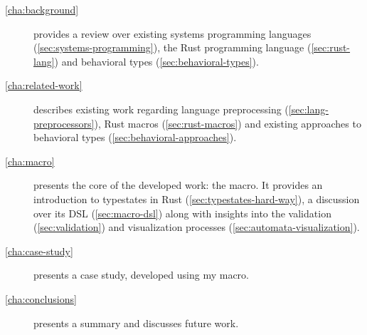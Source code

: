 \begin{description}
    \item[\autoref{cha:background}] provides a review over
        existing systems programming languages (\autoref{sec:systems-programming}),
        the Rust programming language (\autoref{sec:rust-lang}) and
        behavioral types (\autoref{sec:behavioral-types}).
    \item[\autoref{cha:related-work}] describes existing work regarding
        language preprocessing (\autoref{sec:lang-preprocessors}),
        Rust macros (\autoref{sec:rust-macros}) and
        existing approaches to behavioral types (\autoref{sec:behavioral-approaches}).
    \item[\autoref{cha:macro}] presents the core of the developed work: the  macro.
        It provides an introduction to typestates in Rust (\autoref{sec:typestates-hard-way}),
        a discussion over its \gls{DSL} (\autoref{sec:macro-dsl}) along with insights into the validation (\autoref{sec:validation})
        and visualization processes (\autoref{sec:automata-visualization}).
    \item[\autoref{cha:case-study}] presents a case study, developed using my macro.
    \item[\autoref{cha:conclusions}] presents a summary and discusses future work.
\end{description}